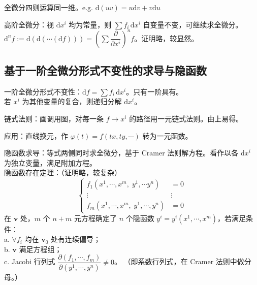 \documentclass[12pt, a4paper, UTF8, openany]{ctexbook}
\newcommand{\dif}{\mathrm{d}}
\newcommand{\mat}[1]{\mathbf{#1}}
\begin{document}
        全微分四则运算同一维。e.g. $\dif(uv) = u\dif v + v \dif u$

        高阶全微分：视 $\dif x^i$ 均为常量，则 $\sum f_i \, \dif x^i$ 自变量不变，可继续求全微分。\\
        $\dif^n f := \dif(\dif(\cdots(\dif f))) = (\sum \dfrac{\partial}{\partial x^i})^n f$。证明略，较显然。

        \subsection{基于一阶全微分形式不变性的求导与隐函数}
        一阶全微分形式不变性：$\dif f = \sum f_i \, \dif x^i$。{\heiti 只有一阶具有}。\\
        若 $x^i$ 为其他变量的复合，则{\heiti 递归}分解 $\dif x^i$。

        链式法则：画调用图，对每一条 $f \to x^i$ 的路径用一元链式法则。由上易得。


        {\heiti 应用}：直线换元，作 $\varphi(t) = f(tx, ty, \cdots)$ 转为一元函数。

        隐函数求导：等式两侧同时求全微分，基于 Cramer 法则解方程。看作以各 $\dif x^i$ 为独立变量，满足附加方程。\\
        隐函数存在定理：（证明略，较复杂）
        $$\begin{cases}
            f_1(x^1, \cdots, x^m, \; y^1, \cdots y^n) &= 0 \\
            \vdots & \vdots \\
            f_m(x^1, \cdots, x^m, \; y^1, \cdots, y^n) &= 0
        \end{cases}$$
        在 $\mat{v}$ 处，$m$ 个 $n + m$ 元方程确定了 $n$ 个隐函数 $y^i = y^i(x^1, \cdots, x^m)$，若满足条件：\\
        a. $\forall f_i$ 均在 $\mat{v}_0$ 处有连续偏导；\\
        b. $\mat{v}$ 满足方程组；\\
        c. Jacobi 行列式 $\dfrac{\partial (f_1, \cdots, f_m)}{\partial (y^1, \cdots, y^n)} \neq 0$。
        （即系数行列式，在 Cramer 法则中做分母。）
\end{document}
